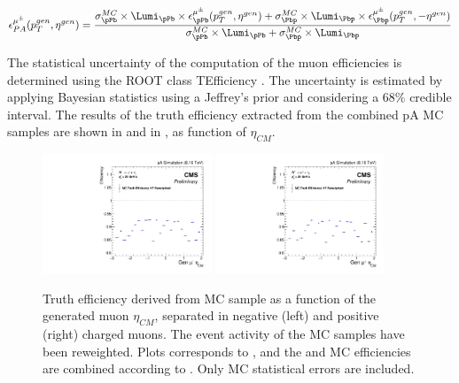 \begin{equation}
\epsilon^{\mu^{\pm}}_{PA}(p_{T}^{gen} , \eta^{gen}) = \frac{\sigma^{MC}_{\pPb}\times\Lumi_{\pPb}\times\epsilon^{\mu^{\pm}}_{\pPb}(p_{T}^{gen} , \eta^{gen}) + \sigma^{MC}_{\Pbp}\times\Lumi_{\Pbp}\times\epsilon^{\mu^{\pm}}_{\Pbp}(p_{T}^{gen} , -\eta^{gen})}{\sigma^{MC}_{\pPb}\times\Lumi_{\pPb} + \sigma^{MC}_{\Pbp}\times\Lumi_{\Pbp}}
\label{eq:MCEfficiencyPA}
\end{equation}

The statistical uncertainty of the computation of the muon efficiencies is determined using the ROOT class TEfficiency \cite{ROOT}. The uncertainty is estimated by applying Bayesian statistics using a Jeffrey's prior and considering a 68$\%$ credible interval. The results of the \WToMuNu truth efficiency extracted from the combined pA MC samples are shown in  and in , as function of $\eta_{CM}$.

\begin{figure}[htb!]
 \begin{center}
   \includegraphics[width=0.45\textwidth]{Figures/WBoson/Analysis/Efficiency/Muon/PA/eff1D_EtaCM_MC_WToMuNu_PA_Minus_Total_HFCorrOnly}
   \includegraphics[width=0.45\textwidth]{Figures/WBoson/Analysis/Efficiency/Muon/PA/eff1D_EtaCM_MC_WToMuNu_PA_Plus_Total_HFCorrOnly}
 \end{center}
 \caption{Truth efficiency derived from \WToMuNu \POWHEG MC sample as a function of the generated muon $\eta_{CM}$, separated in negative (left) and positive (right) charged muons. The event activity of the MC samples have been reweighted. Plots corresponds to , and the \pPb and \Pbp MC efficiencies are combined according to . Only MC statistical errors are included.}
 \label{fig:MCTruthEfficiency}
\end{figure}

